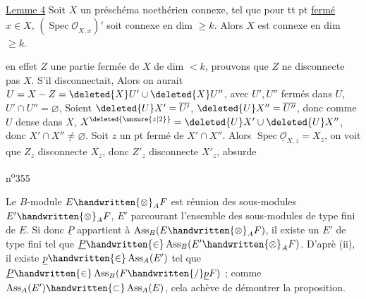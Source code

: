 
\uline{Lemme 4} Soit $X$ un préschéma noethérien connexe,  tel que pour tt pt \uline{fermé} $x\in X$, $(\operatorname{Spec}\underline{\mathcal O}_{X,x})'$ soit connexe en dim $\geq k$. Alors $X$ est connexe en dim $\geq k$.

  en effet  $Z$ une partie fermée de $X$ de dim $<k$, prouvons que $Z$ ne disconnecte pas $X$.  S'il  disconnectait, Alors on aurait $U=X-Z=\deleted{X}U'\cup\deleted{X}U''$, avec $U',U''$ fermés dans $U$, $U'\cap U''=\varnothing$, Soient $\deleted{U}X'=\overline{U'}$, $\deleted{U}X''=\overline{U''}$, donc comme $U$ dense
dans $X$, $X^{\deleted{\unsure{z|2}}}=\deleted{U}X'\cup\deleted{U}X''$, donc $X'\cap X''\ne\varnothing$.
Soit $z$ un pt fermé de $X'\cap X''$. Alors   $\operatorname{Spec}\underline{\mathcal O}_{X,z}=X_z$, on voit que $Z_z$ disconnecte $X_z$, donc $Z'_z$ disconnecte $X'_z$, absurde 

\noindent\hfill n\textsuperscript{o}355

Le $B$-module $E\handwritten{\otimes}_A F$ est réunion des sous-modules $E'\handwritten{\otimes}_A F$, $E'$ parcourant l'ensemble des sous-modules de type fini de $E$. Si donc $\underline P$ appartient à $\operatorname{Ass}_B(E\handwritten{\otimes}_A F)$, il existe un $E'$ de type fini tel que $\underline P\handwritten{\in}\operatorname{Ass}_B(E'\handwritten{\otimes}_A F)$. D'aprè (ii), il existe $\underline p\handwritten{\in}\operatorname{Ass}_A(E')$ tel que $\underline P\handwritten{\in}\operatorname{Ass}_B(F\handwritten{/}\underline p F)$ ; comme $\operatorname{Ass}_A(E')\handwritten{\subset}\operatorname{Ass}_A(E)$, cela achève de démontrer la proposition.

